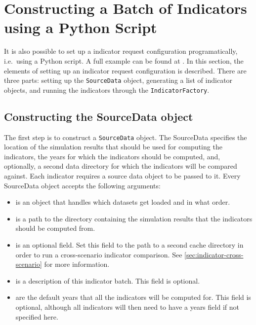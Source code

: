 \section{Constructing a Batch of Indicators using a Python Script}
\label{sec:indicator-configuration-script}

It is also possible to set up a indicator request configuration
programatically, i.e.\ using a Python script. A full example can be found at 
. In this 
section, the elements of setting up an indicator request configuration 
is described. There are three parts: setting up the \verb|SourceData| 
object, generating a list of indicator objects, and running the 
indicators through the \verb|IndicatorFactory|.

\subsection{Constructing the SourceData object}

The first step is to construct a \verb|SourceData| object.
The SourceData specifies 
the location of the simulation results that should be 
used for computing the indicators, the years for which the indicators should be
computed, and, optionally, a second data directory for which the indicators will
be compared against. Each indicator requires a source data object to be passed
to it. Every SourceData object accepts the following arguments:
\begin{itemize}
\tight
\item {} is an object that handles which 
datasets get loaded and in what order. 

\item {} is a path to the directory containing the 
simulation results that the indicators should be computed from.

\item {} is an optional field. Set this field 
to the path to a second cache directory in order to run a 
cross-scenario indicator comparison. See \ref{sec:indicator-cross-scenario}
for more information.

\item {} is a description of this indicator batch. 
This field is optional. 

\item {} are the default years that all the indicators will be computed for.
This field is optional, although all indicators will then need to have a 
years field if not specified here.

\end{itemize}

